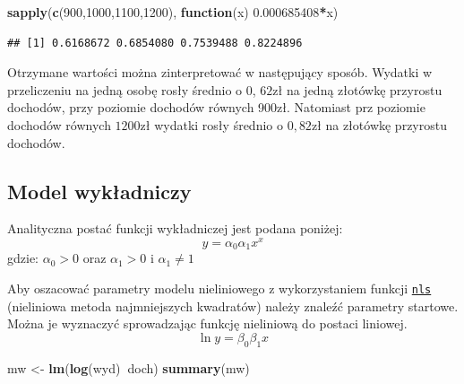 \documentclass[polish,]{book}
\newenvironment{Shaded}{\begin{snugshade}}{\end{snugshade}}
\newcommand{\ControlFlowTok}[1]{\textcolor[rgb]{0.13,0.29,0.53}{\textbf{#1}}}
\newcommand{\DecValTok}[1]{\textcolor[rgb]{0.00,0.00,0.81}{#1}}
\newcommand{\FloatTok}[1]{\textcolor[rgb]{0.00,0.00,0.81}{#1}}
\newcommand{\KeywordTok}[1]{\textcolor[rgb]{0.13,0.29,0.53}{\textbf{#1}}}
\newcommand{\NormalTok}[1]{#1}
\newcommand{\OperatorTok}[1]{\textcolor[rgb]{0.81,0.36,0.00}{\textbf{#1}}}
\newcommand{\StringTok}[1]{\textcolor[rgb]{0.31,0.60,0.02}{#1}}
\begin{document}
\begin{Shaded}
\begin{Highlighting}[]
\KeywordTok{sapply}\NormalTok{(}\KeywordTok{c}\NormalTok{(}\DecValTok{900}\NormalTok{,}\DecValTok{1000}\NormalTok{,}\DecValTok{1100}\NormalTok{,}\DecValTok{1200}\NormalTok{), }\ControlFlowTok{function}\NormalTok{(x) }\FloatTok{0.000685408}\OperatorTok{*}\NormalTok{x)}
\end{Highlighting}
\end{Shaded}

\begin{verbatim}
## [1] 0.6168672 0.6854080 0.7539488 0.8224896
\end{verbatim}

Otrzymane wartości można zinterpretować w następujący sposób. Wydatki w przeliczeniu na jedną osobę rosły średnio o 0, \(62\)zł na jedną złotówkę przyrostu dochodów,
przy poziomie dochodów równych 900zł. Natomiast prz poziomie dochodów równych
\(1200\)zł wydatki rosły średnio o \(0,82\)zł na złotówkę przyrostu dochodów.

\hypertarget{part_13.3.2}{%
\subsection{Model wykładniczy}\label{part_13.3.2}}

Analityczna postać funkcji wykładniczej jest podana poniżej:
\begin{equation}
y=\alpha_0\alpha_1x^x
\label{eq:wz1328}
\end{equation}
gdzie: \(\alpha_0>0\) oraz \(\alpha_1>0\) i \(\alpha_1\neq 1\)

Aby oszacować parametry modelu nieliniowego z wykorzystaniem funkcji \href{https://rdrr.io/r/stats/nls.html}{\texttt{nls}}
(nieliniowa metoda najmniejszych kwadratów) należy znaleźć parametry startowe.
Można je wyznaczyć sprowadzając funkcję nieliniową do postaci liniowej.
\begin{equation}
\ln y = \beta_0 \beta_1 x
\label{eq:wz1329}
\end{equation}

\begin{Shaded}
\begin{Highlighting}[]
\NormalTok{mw <-}\StringTok{ }\KeywordTok{lm}\NormalTok{(}\KeywordTok{log}\NormalTok{(wyd)}\OperatorTok{~}\NormalTok{doch)}
\KeywordTok{summary}\NormalTok{(mw)}
\end{Highlighting}
\end{Shaded}
\end{document}

